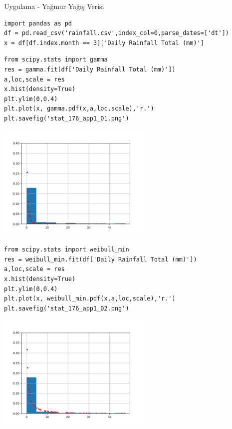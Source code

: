 \documentclass[12pt,fleqn]{article}\usepackage{../../common}
\begin{document}
Uygulama - Yağmur Yağış Verisi


\begin{verbatim}
import pandas as pd
df = pd.read_csv('rainfall.csv',index_col=0,parse_dates=['dt'])
x = df[df.index.month == 3]['Daily Rainfall Total (mm)']
\end{verbatim}

\begin{verbatim}
from scipy.stats import gamma
res = gamma.fit(df['Daily Rainfall Total (mm)'])
a,loc,scale = res  
x.hist(density=True)
plt.ylim(0,0.4)
plt.plot(x, gamma.pdf(x,a,loc,scale),'r.')
plt.savefig('stat_176_app1_01.png')
\end{verbatim}

\includegraphics[width=20em]{stat_176_app1_01.png}

\begin{verbatim}
from scipy.stats import weibull_min
res = weibull_min.fit(df['Daily Rainfall Total (mm)'])
a,loc,scale = res  
x.hist(density=True)
plt.ylim(0,0.4)
plt.plot(x, weibull_min.pdf(x,a,loc,scale),'r.')
plt.savefig('stat_176_app1_02.png')
\end{verbatim}

\includegraphics[width=20em]{stat_176_app1_02.png}
\end{document}
